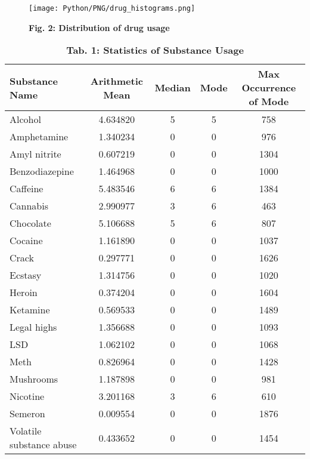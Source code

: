 \documentclass{article}
\begin{document}
\newpage
\begin{figure}[!h]
    \centering
    \texttt{[image: Python/PNG/drug\_histograms.png]}
    \caption{\textbf{Fig. 2: Distribution of drug usage
}}
\end{figure}

\vspace{1.5cm}

\begin{table}[h!]
\centering
\begin{tabular}{|l|S[round-mode=places,round-precision=1]|S[round-mode=places,round-precision=0]|c|c|}
\hline
\textbf{Substance Name} & \textbf{Arithmetic Mean} & \textbf{Median} & \textbf{Mode} & \textbf{Max Occurrence of Mode} \\ \hline
Alcohol & 4.634820 & 5 & 5 & 758 \\ \hline
Amphetamine & 1.340234 & 0 & 0 & 976 \\ \hline
Amyl nitrite & 0.607219 & 0 & 0 & 1304 \\ \hline
Benzodiazepine & 1.464968 & 0 & 0 & 1000 \\ \hline
Caffeine & 5.483546 & 6 & 6 & 1384 \\ \hline
Cannabis & 2.990977 & 3 & 6 & 463 \\ \hline
Chocolate & 5.106688 & 5 & 6 & 807 \\ \hline
Cocaine & 1.161890 & 0 & 0 & 1037 \\ \hline
Crack & 0.297771 & 0 & 0 & 1626 \\ \hline
Ecstasy & 1.314756 & 0 & 0 & 1020 \\ \hline
Heroin & 0.374204 & 0 & 0 & 1604 \\ \hline
Ketamine & 0.569533 & 0 & 0 & 1489 \\ \hline
Legal highs & 1.356688 & 0 & 0 & 1093 \\ \hline
LSD & 1.062102 & 0 & 0 & 1068 \\ \hline
Meth & 0.826964 & 0 & 0 & 1428 \\ \hline
Mushrooms & 1.187898 & 0 & 0 & 981 \\ \hline
Nicotine & 3.201168 & 3 & 6 & 610 \\ \hline
Semeron & 0.009554 & 0 & 0 & 1876 \\ \hline
Volatile substance abuse & 0.433652 & 0 & 0 & 1454 \\ \hline
\end{tabular}
\caption{\textbf{Tab. 1: Statistics of Substance Usage}}
\label{tab:substance_usage}
\end{table}
\newpage
\end{document}

